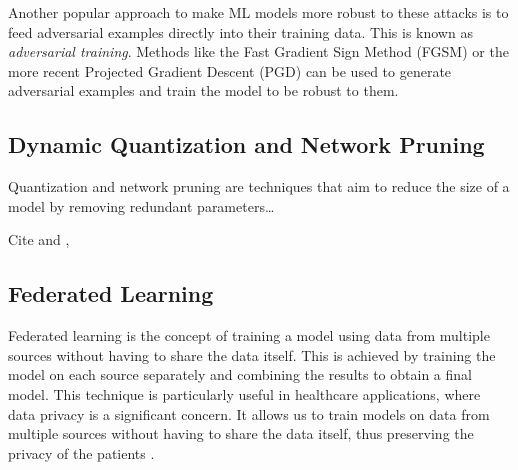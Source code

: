 \documentclass[../main.tex]{subfiles}
\begin{document}
    Another popular approach to make ML models more robust to these attacks is to feed adversarial examples directly into their training data. This is known as \textit{adversarial training}. Methods like the Fast Gradient Sign Method \cite{goodfellowExplainingHarnessingAdversarial2015} (FGSM) or the more recent Projected Gradient Descent (PGD) \autocite{madryDeepLearningModels2019}  can be used to generate adversarial examples and train the model to be robust to them. 

    \subsection{Dynamic Quantization and Network Pruning} \label{sec:dynamic_quantization_pruning_sparsification} 

    Quantization and network pruning are techniques that aim to reduce the size of a model by removing redundant parameters\dots

    Cite \cite{carreira-perpinan_model_2017} and \cite{han_deep_2016}, \cite{carreira-perpinan_compression_2018}

   
    \subsection{Federated Learning} \label{sec:federated_learning} 

    Federated learning is the concept of training a model using data from multiple sources without having to share the data itself. This is achieved by training the model on each source separately and combining the results to obtain a final model. This technique is particularly useful in healthcare applications, where data privacy is a significant concern. It allows us to train models on data from multiple sources without having to share the data itself, thus preserving the privacy of the patients \cite{joshi_federated_2022}.
\end{document}
